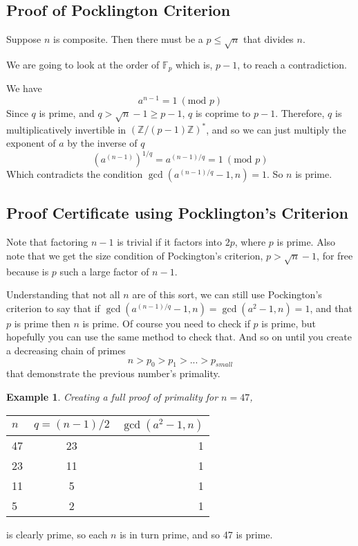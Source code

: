 \documentclass[]{article}
\newtheorem{benexample}{Example}
\newcommand{\Z}{\mathbb{Z}}
\newcommand{\ZMZ}[1]{\Z/#1\Z}
\newcommand{\F}{\mathbb{F}}
\newcommand{\Mod}[1]{\ (\text{mod }#1)}
\begin{document}
\subsection{Proof of Pocklington Criterion}


Suppose $n$ is composite. Then there must be a $p \le \sqrt{n}$ that divides $n$.

We are going to look at the order of $\F_p$ which is, $p-1$, to reach a contradiction.

We have
$$a^{n-1} = 1 \Mod{p}$$
Since $q$ is prime, and $q > \sqrt{n}-1 \ge p-1$, $q$ is coprime to $p-1$. Therefore, $q$ is multiplicatively invertible in $(\ZMZ{(p-1)})^*$, and so we can just multiply the exponent of $a$ by the inverse of $q$
$$(a^{(n-1)})^{1/q} = a^{(n-1)/q} = 1 \Mod{p}$$
Which contradicts the condition $\gcd(a^{(n-1)/q}-1,n) = 1$. So $n$ is prime.

\subsection{Proof Certificate using Pocklington's Criterion}

Note that factoring $n-1$ is trivial if it factors into $2p$, where $p$ is prime.
Also note that we get the size condition of Pockington's criterion, $p > \sqrt{n}-1$, for free because is $p$ such a large factor of $n-1$. 

Understanding that not all $n$ are of this sort, we can still use Pockington's criterion to say that if $\gcd(a^{(n-1)/q}-1,n) = \gcd(a^2-1,n) = 1$, and that $p$ is prime then $n$ is prime. Of course you need to check if $p$ is prime, but hopefully you can use the same method to check that. And so on until you create a decreasing chain of primes
$$n > p_0 > p_1 > ... > p_{small}$$
that demonstrate the previous number's primality.

\begin{tcolorbox}[breakable,
	enhanced,
	standard jigsaw,
	opacityback=0]
	
	\noindent \begin{benexample}
		Creating a full proof of primality for $n=47$,
	\end{benexample}
	
	\begin{tabular}{ l | c | r }
		$n$ & $q=(n-1)/2$ & $\gcd(a^2-1,n)$ \\
		\hline
		47 & 23 & 1\\ \hline
		23 & 11 & 1\\ \hline
		11 & 5 & 1\\ \hline
		5 & 2 & 1\\ \hline
		
	\end{tabular}
	
	 is clearly prime, so each $n$ is in turn prime, and so 47 is prime.
\end{tcolorbox}
\end{document}
